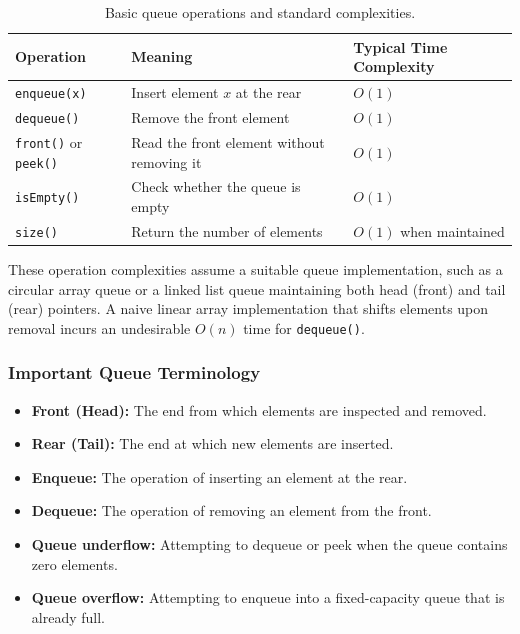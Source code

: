 \begin{table}[htbp]
\centering
\small
\begin{tabularx}{\textwidth}{l p{7.5cm} X}
\toprule
\textbf{Operation} & \textbf{Meaning} & \textbf{Typical Time Complexity} \\
\midrule
\texttt{enqueue(x)}        & Insert element $x$ at the rear             & $O(1)$ \\
\texttt{dequeue()}         & Remove the front element                   & $O(1)$ \\
\texttt{front()} or \texttt{peek()} & Read the front element without removing it & $O(1)$ \\
\texttt{isEmpty()}         & Check whether the queue is empty           & $O(1)$ \\
\texttt{size()}            & Return the number of elements              & $O(1)$ when maintained \\
\bottomrule
\end{tabularx}
\caption{Basic queue operations and standard complexities.}
\end{table}

These operation complexities assume a suitable queue implementation, such as a circular array queue or a linked list queue maintaining both head (front) and tail (rear) pointers. A naive linear array implementation that shifts elements upon removal incurs an undesirable $O(n)$ time for \texttt{dequeue()}.

\subsubsection{Important Queue Terminology}
\begin{itemize}
    \item \textbf{Front (Head):} The end from which elements are inspected and removed.
    \item \textbf{Rear (Tail):} The end at which new elements are inserted.
    \item \textbf{Enqueue:} The operation of inserting an element at the rear.
    \item \textbf{Dequeue:} The operation of removing an element from the front.
    \item \textbf{Queue underflow:} Attempting to dequeue or peek when the queue contains zero elements.
    \item \textbf{Queue overflow:} Attempting to enqueue into a fixed-capacity queue that is already full.
\end{itemize}

